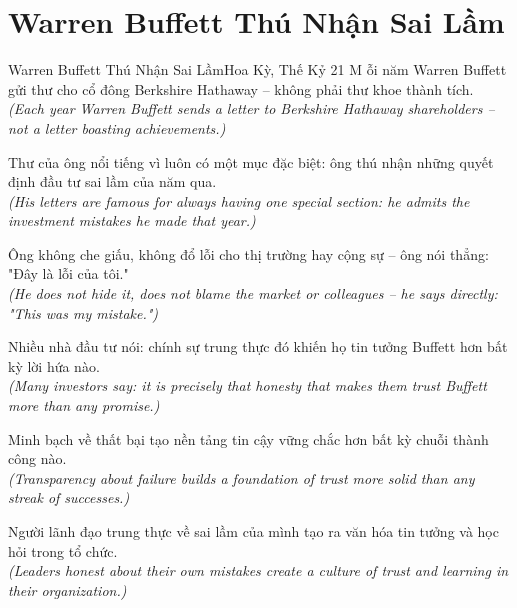 \section{Warren Buffett Thú Nhận Sai Lầm}
\begin{truyen}{Warren Buffett Thú Nhận Sai Lầm}{Hoa Kỳ, Thế Kỷ 21}
M ỗi năm Warren Buffett gửi thư cho cổ đông Berkshire Hathaway -- không phải thư khoe thành tích.\\
\textit{(Each year Warren Buffett sends a letter to Berkshire Hathaway shareholders -- not a letter boasting achievements.)}

Thư của ông nổi tiếng vì luôn có một mục đặc biệt: ông thú nhận những quyết định đầu tư sai lầm của năm qua.\\
\textit{(His letters are famous for always having one special section: he admits the investment mistakes he made that year.)}

Ông không che giấu, không đổ lỗi cho thị trường hay cộng sự -- ông nói thẳng: "Đây là lỗi của tôi."\\
\textit{(He does not hide it, does not blame the market or colleagues -- he says directly: "This was my mistake.")}

Nhiều nhà đầu tư nói: chính sự trung thực đó khiến họ tin tưởng Buffett hơn bất kỳ lời hứa nào.\\
\textit{(Many investors say: it is precisely that honesty that makes them trust Buffett more than any promise.)}

Minh bạch về thất bại tạo nền tảng tin cậy vững chắc hơn bất kỳ chuỗi thành công nào.\\
\textit{(Transparency about failure builds a foundation of trust more solid than any streak of successes.)}

\end{truyen}
\begin{baihoc}
  Người lãnh đạo trung thực về sai lầm của mình tạo ra văn hóa tin tưởng và học hỏi trong tổ chức.\\
  \textit{(Leaders honest about their own mistakes create a culture of trust and learning in their organization.)}
\end{baihoc}

